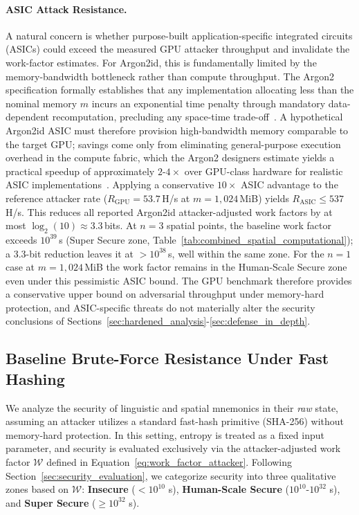 \documentclass[journal,article,submit,pdftex,moreauthors]{Definitions/mdpi}
\newcommand{\add}[1]{#1}
\newcommand{\add}[1]{\added{#1}}
\begin{document}
\paragraph{\add{ASIC Attack Resistance.}}
\add{A natural concern is whether purpose-built application-specific integrated circuits (ASICs) could exceed the measured GPU attacker throughput and invalidate the work-factor estimates. For Argon2id, this is fundamentally limited by the memory-bandwidth bottleneck rather than compute throughput. The Argon2 specification formally establishes that any implementation allocating less than the nominal memory $m$ incurs an exponential time penalty through mandatory data-dependent recomputation, precluding any space-time trade-off~\cite{7467361}. A hypothetical Argon2id ASIC must therefore provision high-bandwidth memory comparable to the target GPU; savings come only from eliminating general-purpose execution overhead in the compute fabric, which the Argon2 designers estimate yields a practical speedup of approximately $2$-$4\times$ over GPU-class hardware for realistic ASIC implementations~\cite{7467361,Wetzels2016}. Applying a conservative $10\times$ ASIC advantage to the reference attacker rate ($R_{\text{GPU}} = 53.7$\,H/s at $m=1{,}024$\,MiB) yields $R_{\text{ASIC}} \leq 537$\,H/s. This reduces all reported Argon2id attacker-adjusted work factors by at most $\log_2(10) \approx 3.3$\,bits. At $n=3$ spatial points, the baseline work factor exceeds $10^{39}$\,s (Super Secure zone, Table~\ref{tab:combined_spatial_computational}); a 3.3-bit reduction leaves it at $>10^{38}$\,s, well within the same zone. For the $n=1$ case at $m=1{,}024$\,MiB the work factor remains in the Human-Scale Secure zone even under this pessimistic ASIC bound. The GPU benchmark therefore provides a conservative upper bound on adversarial throughput under memory-hard protection, and ASIC-specific threats do not materially alter the security conclusions of Sections~\ref{sec:hardened_analysis}-\ref{sec:defense_in_depth}.}

\subsection{Baseline Brute-Force Resistance Under Fast Hashing}
\label{sec:unhardened_analysis}

We analyze the security of linguistic and spatial mnemonics in their \emph{raw} state, assuming an attacker utilizes a standard fast-hash primitive (SHA-256) without memory-hard protection. In this setting, entropy is treated as a fixed input parameter, and security is evaluated exclusively via the attacker-adjusted work factor $\mathcal{W}$ defined in Equation~\ref{eq:work_factor_attacker}. Following Section~\ref{sec:security_evaluation}, we categorize security into three qualitative zones based on $\mathcal{W}$: \textbf{Insecure} ($<10^{10}$ s), \textbf{Human-Scale Secure} ($10^{10}$-$10^{32}$ s), and \textbf{Super Secure} ($\ge 10^{32}$ s).
\end{document}
